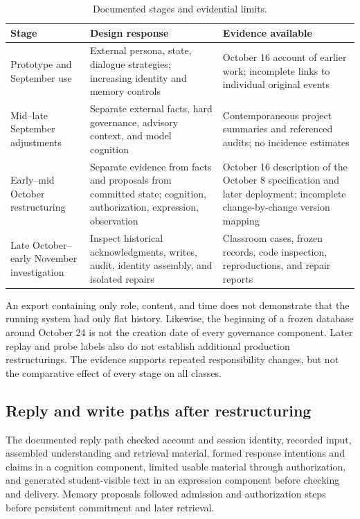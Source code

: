\documentclass[11pt,a4paper]{article}
\begin{document}
\begin{table}[htbp]
\centering\small
\caption{Documented stages and evidential limits.}\label{tab:stages}
\begin{tabular}{P{.17\linewidth}P{.35\linewidth}P{.38\linewidth}}
\toprule
Stage & Design response & Evidence available \\
\midrule
Prototype and September use & External persona, state, dialogue strategies; increasing identity and memory controls & October 16 account of earlier work; incomplete links to individual original events \\
Mid--late September adjustments & Separate external facts, hard governance, advisory context, and model cognition & Contemporaneous project summaries and referenced audits; no incidence estimates \\
Early--mid October restructuring & Separate evidence from facts and proposals from committed state; cognition, authorization, expression, observation & October 16 description of the October 8 specification and later deployment; incomplete change-by-change version mapping \\
Late October--early November investigation & Inspect historical acknowledgments, writes, audit, identity assembly, and isolated repairs & Classroom cases, frozen records, code inspection, reproductions, and repair reports \\
\bottomrule
\end{tabular}
\end{table}

An export containing only role, content, and time does not demonstrate that the running system had only flat history. Likewise, the beginning of a frozen database around October 24 is not the creation date of every governance component. Later replay and probe labels also do not establish additional production restructurings. The evidence supports repeated responsibility changes, but not the comparative effect of every stage on all classes.

\subsection{Reply and write paths after restructuring}
The documented reply path checked account and session identity, recorded input, assembled understanding and retrieval material, formed response intentions and claims in a cognition component, limited usable material through authorization, and generated student-visible text in an expression component before checking and delivery. Memory proposals followed admission and authorization steps before persistent commitment and later retrieval.
\end{document}
